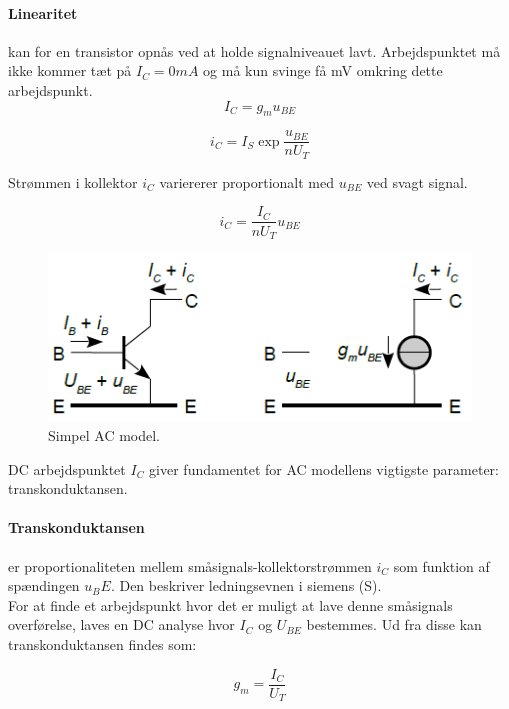\documentclass[danish]{article}
\begin{document}
\paragraph{Linearitet} kan for en transistor opnås ved at holde signalniveauet lavt. Arbejdspunktet må ikke kommer tæt på $I_C = 0 mA$ og må kun svinge få mV omkring dette arbejdspunkt. 
\begin{equation} 
I_C = g_m u_{BE}
\end{equation}

\begin{equation} 
i_C = I_S \exp \dfrac{u_{BE}}{n U_T}
\end{equation}

Strømmen i kollektor $i_C$ variererer proportionalt med $u_{BE}$ ved svagt signal.

\begin{equation} 
i_C = \dfrac{I_C}{n U_T} u_{BE}
\end{equation}

\begin{figure} [H]
	\centering
	\includegraphics[width=0.75\linewidth]{graphics/ACmodel}
	\caption{Simpel AC model.}
	\label{fig:ACmodel}
\end{figure}

DC arbejdspunktet $I_C$ giver fundamentet for AC modellens vigtigste parameter: transkonduktansen.

\paragraph{Transkonduktansen} er proportionaliteten mellem småsignals-kollektorstrømmen $i_C$ som funktion af spændingen $u_BE$. 
Den beskriver ledningsevnen i siemens (S).\\

For at finde et arbejdspunkt hvor det er muligt at lave denne småsignals overførelse, laves en DC analyse hvor $I_C$  og $U_{BE}$ bestemmes. Ud fra disse kan transkonduktansen findes som:

\begin{equation} 
g_m = \dfrac{I_C}{U_T}
\end{equation}
\end{document}
